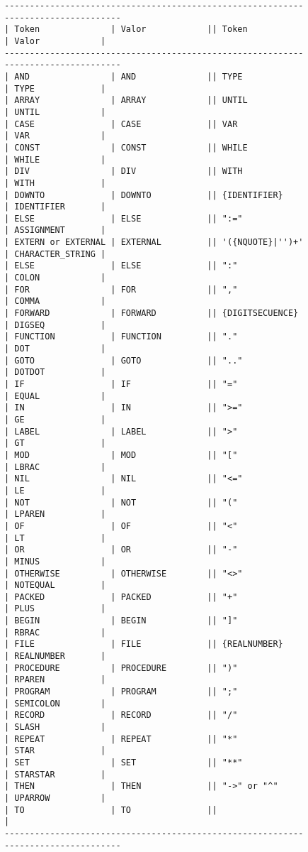 \begin{figure}
\begin{flushleft}
\begin{verbatim}
----------------------------------------------------------------------------------
| Token              | Valor            || Token              | Valor            |
----------------------------------------------------------------------------------
| AND                | AND              || TYPE               | TYPE             |        
| ARRAY              | ARRAY            || UNTIL              | UNTIL            |
| CASE               | CASE             || VAR                | VAR              |
| CONST              | CONST            || WHILE              | WHILE            | 
| DIV                | DIV              || WITH               | WITH             |
| DOWNTO             | DOWNTO           || {IDENTIFIER}       | IDENTIFIER       | 
| ELSE               | ELSE             || ":="               | ASSIGNMENT       | 
| EXTERN or EXTERNAL | EXTERNAL         || '({NQUOTE}|'')+'   | CHARACTER_STRING |
| ELSE               | ELSE             || ":"                | COLON            |
| FOR                | FOR              || ","                | COMMA            |
| FORWARD            | FORWARD          || {DIGITSECUENCE}    | DIGSEQ           |
| FUNCTION           | FUNCTION         || "."                | DOT              |
| GOTO               | GOTO             || ".."               | DOTDOT           |
| IF                 | IF               || "="                | EQUAL            |
| IN                 | IN               || ">="               | GE               |
| LABEL              | LABEL            || ">"                | GT               |
| MOD                | MOD              || "["                | LBRAC            |
| NIL                | NIL              || "<="               | LE               |
| NOT                | NOT              || "("                | LPAREN           |
| OF                 | OF               || "<"                | LT               |
| OR                 | OR               || "-"                | MINUS            |
| OTHERWISE          | OTHERWISE        || "<>"               | NOTEQUAL         |
| PACKED             | PACKED           || "+"                | PLUS             |
| BEGIN              | BEGIN            || "]"                | RBRAC            |
| FILE               | FILE             || {REALNUMBER}       | REALNUMBER       |
| PROCEDURE          | PROCEDURE        || ")"                | RPAREN           | 
| PROGRAM            | PROGRAM          || ";"                | SEMICOLON        |
| RECORD             | RECORD           || "/"                | SLASH            |
| REPEAT             | REPEAT           || "*"                | STAR             |
| SET                | SET              || "**"               | STARSTAR         |
| THEN               | THEN             || "->" or "^"        | UPARROW          |
| TO                 | TO               ||                                       |
----------------------------------------------------------------------------------



\end{verbatim}
\end{flushleft}
\end{figure}
